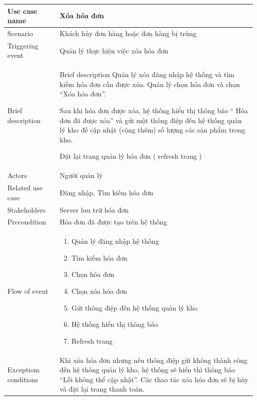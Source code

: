 \documentclass{article}
\begin{document}
\begin{tabular}{|m{4cm}|m{12cm}|}
		\hline
		Use case name & Xóa hóa đơn\\
		\hline
		Scenario & Khách hủy đơn hàng hoặc đơn hàng bị trùng \\
		\hline
		Triggering event & Quản lý thực hiện việc xóa hóa đơn\\
		\hline
		Brief description & Brief description	Quản lý xóa đăng nhập hệ thống và tìm kiếm hóa đơn cần được xóa. Quản lý chọn hóa đơn và chọn “Xóa hóa đơn”.
		 
Sau khi hóa đơn được xóa, hệ thống hiển thị thông báo “ Hóa đơn đã được xóa” và gửi một thông điệp đến hệ thống quản lý kho đế cập nhật (cộng thêm) số lượng các sản phẩm trong kho.

Đặt lại trang quản lý hóa đơn ( refresh trang )
\\
		\hline
		 Actors &  Người quản lý\\
		\hline
		Related use case & Đăng nhập, Tìm kiếm hóa đơn\\
		\hline
		Stakeholders & Server luu trữ hóa đơn \\
		\hline
		Precondition & Hóa đơn đã được tạo trên hệ thống \\
		\hline
		Flow of event & 
			\begin{enumerate}
				\item Quản lý đăng nhập hệ thống 
				\item Tìm kiếm hóa đơn
				\item Chọn hóa đơn
				\item Chọn xóa hóa đơn
				\item Gửi thông điệp đến hệ thống quản lý kho
				\item Hệ thống hiển thị thông báo
				\item Refresh trang 
			\end{enumerate}\\
		\hline
		Exceptiom conditions & Khi xóa hóa đơn nhưng nếu thông điệp gửi không thành công đến hệ thống quản lý kho, hệ thống sẽ hiển thì thông báo “Lỗi không thể cập nhật”. Các thao tác xóa hóa đơn sẽ bị hủy và đặt lại trang thanh toán.\\
		\hline
\end{tabular}
\end{document}
